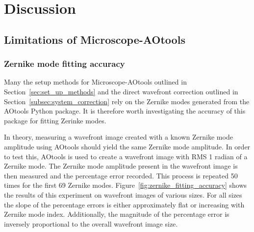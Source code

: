 \chapter{Discussion}

\section{Limitations of Microscope-AOtools}
\label{sec:limitations}

\subsection{Zernike mode fitting accuracy}
\label{subsec:zernike_accuracy}

Many the setup methods for Microscope-AOtools outlined in 
Section~\ref{sec:set_up_methods} and the direct wavefront correction 
outlined in Section~\ref{subsec:system_correction} rely on the Zernike 
modes generated from the AOtools Python package\cite{townson2019aotools}. 
It is therefore worth investigating the accuracy of this package for 
fitting Zerinke modes. 

In theory, measuring a wavefront image created with a known Zernike mode amplitude using AOtools should yield the same Zernike mode amplitude. In order to test this, AOtools is used to create a wavefront image with RMS 1 radian of a Zernike mode. The Zernike mode amplitude present in the wavefront image is then measured and the percentage error recorded. This process is repeated 50 times for the first 69 Zernike modes. Figure~\ref{fig:zernike_fitting_accuracy} shows the results of this experiment on wavefront images of various sizes. For all sizes the slope of the percentage errors is either approximately flat or increasing with Zernike mode index. Additionally, the magnitude of the percentage error is inversely proportional to the overall wavefront image size. 

